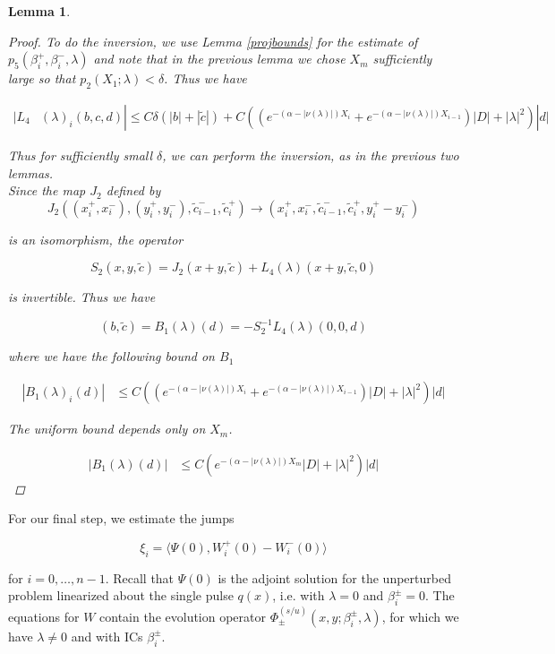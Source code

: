\documentclass[12pt]{article}
\newtheorem{lemma}{Lemma}
\begin{document}
\begin{lemma}
\begin{proof}
To do the inversion, we use Lemma \ref{projbounds} for the estimate of $p_5(\beta_i^+, \beta_i^-, \lambda)$ and note that in the previous lemma we chose $X_m$ sufficiently large so that $p_2(X_1; \lambda) < \delta$. Thus we have

\begin{align*}
|L_4&(\lambda)_i(b, c, d)| \leq C \delta (|b| + |\tilde{c}|) + C ( (e^{-(\alpha - |\nu(\lambda)|) X_i} + e^{-(\alpha - |\nu(\lambda)|) X_{i-1}})|D| + |\lambda|^2)|d|
\end{align*}

Thus for sufficiently small $\delta$, we can perform the inversion, as in the previous two lemmas.\\

Since the map $J_2$ defined by
\[
J_2( (x_i^+, x_i^-),(y_i^+, y_i^-), \tilde{c}_{i-1}^-, \tilde{c}_i^+ ) \rightarrow ( x_i^+, x_i^-, \tilde{c}_{i-1}^-, \tilde{c}_i^+, y_i^+ -  y_i^- )
\]

is an isomorphism, the operator

\[
S_2(x,y, \tilde{c}) = J_2(x+y, \tilde{c}) + L_4(\lambda)(x+y,\tilde{c}, 0)
\]

is invertible. Thus we have

\begin{equation}
(b,\tilde{c}) = B_1(\lambda)(d) = -S_2^{-1} L_4(\lambda)(0, 0, d)
\end{equation}

where we have the following bound on $B_1$

\begin{align*}
|B_1(\lambda)_i(d)| &\leq C ( (e^{-(\alpha - |\nu(\lambda)|) X_i} + e^{-(\alpha - |\nu(\lambda)|) X_{i-1}})|D| + |\lambda|^2 )|d|
\end{align*}

The uniform bound depends only on $X_m$. 

\begin{align*}
|B_1(\lambda)(d)| &\leq C ( e^{-(\alpha - |\nu(\lambda)|) X_m} |D| + |\lambda|^2 )|d|
\end{align*}

 
\end{proof}
\end{lemma}

For our final step, we estimate the jumps

\begin{equation}
\xi_i = \langle \Psi(0), W_i^+(0) - W_i^-(0) \rangle 
\end{equation}

for $i = 0, \dots, n-1$. Recall that $\Psi(0)$ is the adjoint solution for the unperturbed problem linearized about the single pulse $q(x)$, i.e. with $\lambda = 0$ and $\beta_i^\pm = 0$. The equations for $W$ contain the evolution operator $\Phi^{(s/u)}_\pm(x, y; \beta_i^\pm, \lambda)$, for which we have $\lambda \neq 0$ and with ICs $\beta_i^\pm$.\\
\end{document}
